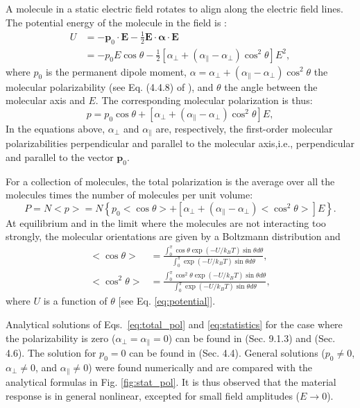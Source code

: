 \documentclass[12pt,letterpaper]{article}
\begin{document}
A molecule in a static electric field rotates to align along the electric field lines. The potential energy of the molecule in the field is  \cite{boyd2008,bonin1997}:
\begin{align}\label{eq:potential}
U &=-\mathbf{p}_0\cdot\mathbf{E} - \frac{1}{2}\mathbf{E}\cdot\mathbf{\boldsymbol\alpha}\cdot\mathbf{E}\nonumber\\
&= -p_0E\cos\theta-\frac{1}{2}\left[\alpha_\bot + (\alpha_\parallel - \alpha_\bot)\cos^2\theta\right]E^2,
\end{align}
where $p_0$ is the permanent dipole moment, $\alpha = \alpha_\bot + (\alpha_\parallel - \alpha_\bot)\cos^2\theta$ the molecular polarizability (see Eq. (4.4.8) of \cite{boyd2008}), and $\theta$ the angle between the molecular axis and $E$. The corresponding molecular polarization is thus:
\begin{equation}\label{eq:single_pol}
 p = p_0\cos\theta+\left[\alpha_\bot + (\alpha_\parallel - \alpha_\bot)\cos^2\theta\right]E,
\end{equation}
In the equations above, $\alpha_\bot$ and $\alpha_\parallel$ are, respectively, the first-order molecular polarizabilities perpendicular and parallel to the molecular axis,i.e., perpendicular and parallel to the vector $\mathbf{p}_0$.

For a collection of molecules, the total polarization is the average over all the molecules times the number of molecules per unit volume:
\begin{equation}\label{eq:total_pol}
 P=N<p>=N\left\lbrace p_0<\cos\theta>+\left[\alpha_\bot + (\alpha_\parallel - \alpha_\bot)<\cos^2\theta>\right]E\right\rbrace.
\end{equation}
At equilibrium and in the limit where the molecules are not interacting too strongly, the molecular orientations are given by a Boltzmann distribution and
\begin{subequations}\label{eq:statistics}
 \begin{align}
  <\cos\theta>&=\frac{\int_0^\pi\cos\theta\exp(-U/k_BT)\sin\theta d\theta}{\int_0^\pi\exp(-U/k_BT)\sin\theta d\theta},\\
  <\cos^2\theta>&=\frac{\int_0^\pi\cos^2\theta\exp(-U/k_BT)\sin\theta d\theta}{\int_0^\pi\exp(-U/k_BT)\sin\theta d\theta},
 \end{align}
\end{subequations}
where $U$ is a function of $\theta$ [see Eq. \eqref{eq:potential}]. 

Analytical solutions of Eqs.~\eqref{eq:total_pol} and \eqref{eq:statistics} for the case where the polarizability is zero ($\alpha_\bot = \alpha_\parallel=0$) can be found in \cite{hook1991} (Sec. 9.1.3) and \cite{jackson1999} (Sec. 4.6). The solution for $p_0 = 0$ can be found in \cite{boyd2008} (Sec. 4.4). General solutions ($p_0\neq 0$, $\alpha_\bot\neq 0$, and $\alpha_\parallel\neq 0$) were found numerically and are compared with the analytical formulas in Fig. \ref{fig:stat_pol}. It is thus observed that the material response is in general nonlinear, excepted for small field amplitudes ($E\rightarrow 0$).
\end{document}
